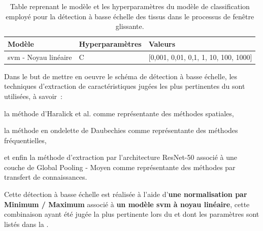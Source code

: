 \begin{table}[H]
    \centering
    \begin{tabular}{lll}
        \toprule
        \textbf{Modèle}                                 & \textbf{Hyperparamètres}  & \textbf{Valeurs}                          \\ \midrule
        \gls{svm} - Noyau linéaire                      & C                         & [0,001, 0,01, 0,1, 1, 10, 100, 1000]      \\ 
        \bottomrule 
    \end{tabular} 
    \caption{Table reprenant le modèle et les hyperparamètres du modèle de classification employé pour la détection à basse échelle des tissus dans le processus de fenêtre glissante.}
    \label{tab:parameters_image_improvement_sliding_window_models}
\end{table}\par

Dans le but de mettre en oeuvre le schéma de détection à basse échelle, les techniques d'extraction de caractéristiques jugées les plus pertinentes du  sont utilisées, à savoir~: 
\begin{inlinerate}
    \item la méthode d'Haralick et al. comme représentante des méthodes spatiales,
    \item la méthode en ondelette de Daubechies comme représentante des méthodes fréquentielles,
    \item et enfin la méthode d'extraction par l'architecture ResNet-50 associé à une couche de Global Pooling - Moyen comme représentante des méthodes par transfert de connaissances.
\end{inlinerate} Cette détection à basse échelle est réalisée à l'aide d'\textbf{une normalisation par Minimum / Maximum} associé à \textbf{un modèle \gls{svm} à noyau linéaire}, cette combinaison ayant été jugée la plus pertinente lors du  et dont les paramètres sont listés dans la .\par

